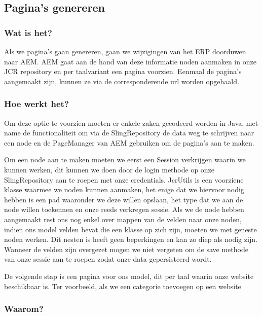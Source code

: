 \documentclass{article}
\begin{document}
	\subsection{Pagina's genereren} 
	\subsubsection{Wat is het?}
	Als we pagina's gaan genereren, gaan we wijzigingen van het ERP doorduwen naar AEM. AEM gaat aan de hand van deze informatie noden aanmaken in onze JCR repository en per taalvariant een pagina voorzien. Eenmaal de pagina's aangemaakt zijn, kunnen ze via de corresponderende url worden opgehaald.
	\subsubsection{Hoe werkt het?}
	Om deze optie te voorzien moeten er enkele zaken gecodeerd worden in Java, met name de functionaliteit om via de SlingRepository de data weg te schrijven naar een node en de PageManager van AEM gebruiken om de pagina's aan te maken.
	\par
	Om een node aan te maken moeten we eerst een Session verkrijgen waarin we kunnen werken, dit kunnen we doen door de login methode op onze SlingRepository aan te roepen met onze credentials. JcrUtils is een voorziene klasse waarmee we noden kunnen aanmaken, het enige dat we hiervoor nodig hebben is een pad waaronder we deze willen opslaan, het type dat we aan de node willen toekennen en onze reeds verkregen sessie. Als we de node hebben aangemaakt rest ons nog enkel over mappen van de velden naar onze noden, indien ons model velden bevat die een klasse op zich zijn, moeten we met geneste noden werken. Dit nesten is heeft geen beperkingen en kan zo diep als nodig zijn. Wanneer de velden zijn overgezet mogen we niet vergeten om de save methode van onze sessie aan te roepen zodat onze data gepersisteerd wordt.
	\par
	De volgende stap is een pagina voor ons model, dit per taal waarin onze website beschikbaar is. Ter voorbeeld, als we een categorie toevoegen op een website
	\subsubsection{Waarom?}
\end{document}
